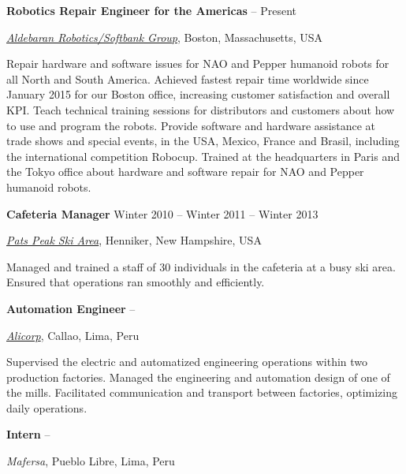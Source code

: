 \documentclass[letterpaper,MMMyyyy,nonstop]{simpleresumecv}
\begin{document}
\begin{body}
\textbf{Robotics Repair Engineer for the Americas}
\hfill
{} --
Present 
\begin{detail}
\normalsize{ \href{https://www.aldebaran.com/en}
{\textit{Aldebaran Robotics/Softbank Group}},
Boston, Massachusetts, USA }
\end{detail}

\GapNoBreak
\BulletItem
Repair hardware and software issues for NAO and Pepper humanoid robots for all North and South America. 
\BulletItem
Achieved fastest repair time worldwide since January 2015 for our Boston office, increasing customer satisfaction and overall KPI.
\BulletItem
Teach technical training sessions for distributors and customers about how to use and program the robots.
\BulletItem
Provide software and hardware assistance at trade shows and special events, in the USA, Mexico, France and Brasil, including the international competition Robocup.
\BulletItem
Trained at the headquarters in Paris and the Tokyo office about hardware and software repair for NAO and Pepper humanoid robots.

\BigGap
\textbf{Cafeteria Manager}
\hfill
Winter 2010 --
Winter 2011 --
Winter 2013
\begin{detail}
\normalsize{ \href{http://www.patspeak.com/}
{\textit{Pats Peak Ski Area}},
Henniker, New Hampshire, USA }
\end{detail}

\GapNoBreak
\BulletItem
Managed and trained a staff of 30 individuals in the cafeteria at a busy ski area.
\BulletItem
Ensured that operations ran smoothly and efficiently.

\BigGap
\textbf{Automation Engineer}
\hfill
{} --
\begin{detail}
\normalsize{ \href{http://www.alicorp.com.pe/alicorp/index.html}
{\textit{Alicorp}},
Callao, Lima, Peru }
\end{detail}

\GapNoBreak
\BulletItem
Supervised the electric and automatized engineering operations within two production factories.
\BulletItem
Managed the engineering and automation design of one of the mills. Facilitated communication and transport between factories, optimizing daily operations.

\BigGap
\textbf{Intern}
\hfill
{} --
\begin{detail}
\normalsize{ \textit{Mafersa},
Pueblo Libre, Lima, Peru }
\end{detail}


\end{body}
\end{document}
